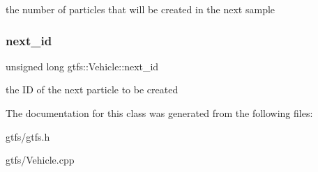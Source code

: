 the number of particles that will be created in the next sample \mbox{\label{classgtfs_1_1Vehicle_aab535dd9953f9650e2adc351965779b1}} 
\subsubsection{\texorpdfstring{next\+\_\+id}{next\_id}}
{\footnotesize\ttfamily unsigned long gtfs\+::\+Vehicle\+::next\+\_\+id}

the ID of the next particle to be created 

The documentation for this class was generated from the following files\+:\begin{DoxyCompactItemize}
\item 
gtfs/gtfs.\+h\item 
gtfs/Vehicle.\+cpp\end{DoxyCompactItemize}
